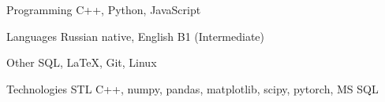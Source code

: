 

\begin{cvskills}

%


  \cvskill
    {Programming} %
    {C++, Python, JavaScript} %

  \cvskill
    {Languages} %
    {Russian native, English B1 (Intermediate)} %

\cvskill
    {Other} %
    {SQL, LaTeX, Git, Linux} %

    \cvskill
  {Technologies}
  {STL C++, numpy, pandas,
  matplotlib, scipy, pytorch, MS SQL}
\end{cvskills}

